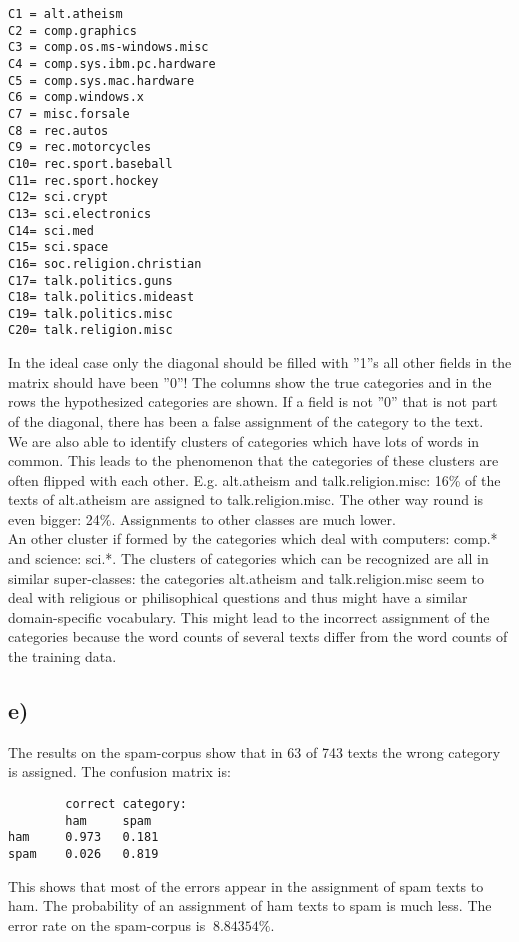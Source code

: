 \documentclass[12pt, a4paper, fleqn]{scrartcl}
\begin{document}
\begin{lstlisting}
C1 = alt.atheism
C2 = comp.graphics
C3 = comp.os.ms-windows.misc
C4 = comp.sys.ibm.pc.hardware
C5 = comp.sys.mac.hardware
C6 = comp.windows.x
C7 = misc.forsale
C8 = rec.autos
C9 = rec.motorcycles
C10= rec.sport.baseball
C11= rec.sport.hockey
C12= sci.crypt
C13= sci.electronics
C14= sci.med
C15= sci.space
C16= soc.religion.christian
C17= talk.politics.guns
C18= talk.politics.mideast
C19= talk.politics.misc
C20= talk.religion.misc
\end{lstlisting}
In the ideal case only the diagonal should be filled with ''1''s all other fields in the matrix should have been ''0''! The columns show the true categories and in the rows the hypothesized categories are shown. If a field is not ''0'' that is not part of the diagonal, there has been a false assignment of the category to the text.\\
We are also able to identify clusters of categories which have lots of words in common. This leads to the phenomenon that the categories of these clusters are often flipped with each other. E.g. alt.atheism and talk.religion.misc: 16\% of the texts of alt.atheism are assigned to talk.religion.misc. The other way round is even bigger: 24\%. Assignments to other classes are much lower.\\
An other cluster if formed by the categories which deal with computers: comp.* and science: sci.*. The clusters of categories which can be recognized are all in similar super-classes: the categories alt.atheism and talk.religion.misc seem to deal with religious or philisophical questions and thus might have a similar domain-specific vocabulary. This might lead to the incorrect assignment of the categories because the word counts of several texts differ from the word counts of the training data.
\subsection*{e)}
The results on the spam-corpus show that in 63 of 743 texts the wrong category is assigned. The confusion matrix is:\\
\begin{lstlisting}
		correct category:
		ham		spam
ham		0.973	0.181
spam	0.026	0.819
\end{lstlisting}
This shows that most of the errors appear in the assignment of spam texts to ham. The probability of an assignment of ham texts to spam is much less. The error rate on the spam-corpus is $~8.84354\%$.
\end{document}
